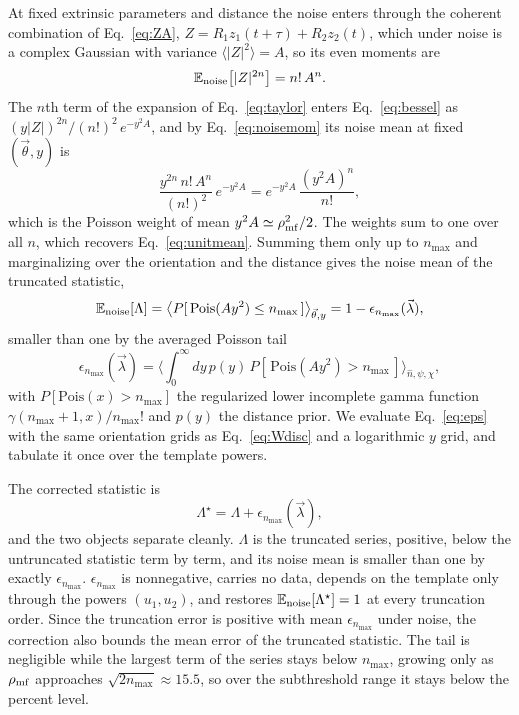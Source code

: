 \documentclass[aps,prd,twocolumn,superscriptaddress,nofootinbib]{revtex4-2}
\begin{document}
At fixed extrinsic parameters and distance the noise enters through
the coherent combination of Eq.~\eqref{eq:ZA},
$Z = R_1 z_1(t + \tau) + R_2 z_2(t)$, which under noise is a
complex Gaussian with variance $\langle |Z|^2 \rangle = A$, so its
even moments are
\begin{equation}
\mathbb{E}_{\rm noise}\big[ |Z|^{2n} \big] = n!\, A^n .
\label{eq:noisemom}
\end{equation}
The $n$th term of the expansion of Eq.~\eqref{eq:taylor} enters
Eq.~\eqref{eq:bessel} as $(y |Z|)^{2n} / (n!)^2\, e^{-y^2 A}$, and
by Eq.~\eqref{eq:noisemom} its noise mean at fixed
$(\vec\theta, y)$ is
\begin{equation}
\frac{y^{2n}\, n!\, A^n}{(n!)^2}\, e^{-y^2 A}
= e^{-y^2 A}\, \frac{(y^2 A)^n}{n!},
\label{eq:poisweight}
\end{equation}
which is the Poisson weight of mean $y^2 A \simeq \rho_{\rm mf}^2/2$.
The weights sum to one over all $n$, which recovers
Eq.~\eqref{eq:unitmean}. Summing them only up to $n_{\max}$ and
marginalizing over the orientation and the distance gives the noise
mean of the truncated statistic,
\begin{equation}
\mathbb{E}_{\rm noise}[\Lambda] = \big\langle
P[\,\mathrm{Pois}(A y^2) \leq n_{\max}\,]
\big\rangle_{\vec\theta, y} = 1 - \epsilon_{n_{\max}}(\vec\lambda),
\label{eq:truncmean}
\end{equation}
smaller than one by the averaged Poisson tail
\begin{equation}
\epsilon_{n_{\max}}(\vec\lambda) = \Big\langle \int_0^\infty dy\, p(y)\,
P[\,\mathrm{Pois}(A y^2) > n_{\max}\,] \Big\rangle_{\hat n, \psi, \chi},
\label{eq:eps}
\end{equation}
with $P[\mathrm{Pois}(x) > n_{\max}]$ the regularized lower incomplete
gamma function $\gamma(n_{\max}+1, x)/n_{\max}!$ \cite{DLMF} and
$p(y)$ the distance prior. We evaluate Eq.~\eqref{eq:eps} with the
same orientation grids as Eq.~\eqref{eq:Wdisc} and a logarithmic $y$
grid, and tabulate it once over the template powers.

The corrected statistic is
\begin{equation}
\Lambda^\star = \Lambda + \epsilon_{n_{\max}}(\vec\lambda),
\label{eq:lamstar}
\end{equation}
and the two objects separate cleanly. $\Lambda$ is the truncated
series, positive, below the untruncated statistic term by term, and
its noise mean is smaller than one by exactly $\epsilon_{n_{\max}}$.
$\epsilon_{n_{\max}}$ is nonnegative, carries no data,
depends on the template only through the powers $(u_1, u_2)$, and
restores $\mathbb{E}_{\rm noise}[\Lambda^\star] = 1$ at every
truncation order. Since the truncation error is positive with mean
$\epsilon_{n_{\max}}$ under noise, the correction also bounds the mean
error of the truncated statistic. The tail is negligible while the
largest term of the series stays below $n_{\max}$, growing only as
$\rho_{\rm mf}$ approaches $\sqrt{2 n_{\max}} \approx 15.5$, so over
the subthreshold range it stays below the percent level.
\end{document}
